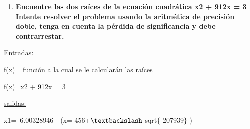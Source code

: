 \documentclass[12pt]{article}
\renewcommand{\_}{\kern-1.5pt\textunderscore\kern-1.5pt}
\begin{document}
\begin{enumerate}
\tab \tab 
\vspace{\baselineskip}	\item {\fontsize{10pt}{12.0pt}\selectfont \textbf{Encuentre las dos raíces de la ecuación cuadrática x2 + 912x = 3 Intente resolver el problema usando la aritmética de precisión doble, tenga en cuenta la pérdida de signiﬁcancia y debe contrarrestar.}\par}
\end{enumerate}\par


\vspace{\baselineskip}
\setlength{\parskip}{8.04pt}
\setlength{\parskip}{0.0pt}
\begin{adjustwidth}{1.0in}{0.0in}
\begin{justify}
{\fontsize{10pt}{12.0pt}\selectfont \uline{Entradas: }\par}
\end{justify}\par

\end{adjustwidth}

\begin{adjustwidth}{1.0in}{0.0in}
\begin{justify}
{\fontsize{10pt}{12.0pt}\selectfont f(x)= función a la cual se le calcularán las raíces \par}
\end{justify}\par

\end{adjustwidth}

\begin{adjustwidth}{1.0in}{0.0in}
\begin{justify}
{\fontsize{10pt}{12.0pt}\selectfont f(x)=x2 + 912x = 3\par}
\end{justify}\par

\end{adjustwidth}

\begin{adjustwidth}{1.0in}{0.0in}
\begin{justify}
{\fontsize{10pt}{12.0pt}\selectfont \uline{salidas:}\par}
\end{justify}\par

\end{adjustwidth}

\begin{adjustwidth}{1.0in}{0.0in}
\begin{justify}
{\fontsize{10pt}{12.0pt}\selectfont x1=\ 6.00328946\ \   (x=-456+$\textbackslash$ sqrt$ \{ $ 207939$ \} $ )\par}
\end{justify}\par

\end{adjustwidth}
\end{document}
